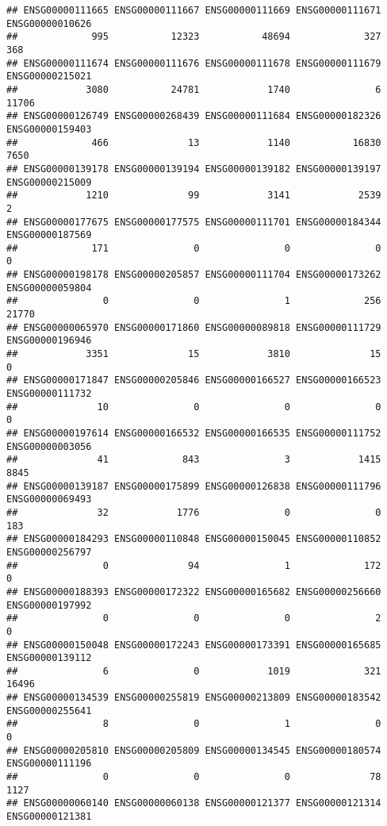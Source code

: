 \documentclass[
]{article}
\begin{document}
\begin{verbatim}
## ENSG00000111665 ENSG00000111667 ENSG00000111669 ENSG00000111671 ENSG00000010626 
##             995           12323           48694             327             368 
## ENSG00000111674 ENSG00000111676 ENSG00000111678 ENSG00000111679 ENSG00000215021 
##            3080           24781            1740               6           11706 
## ENSG00000126749 ENSG00000268439 ENSG00000111684 ENSG00000182326 ENSG00000159403 
##             466              13            1140           16830            7650 
## ENSG00000139178 ENSG00000139194 ENSG00000139182 ENSG00000139197 ENSG00000215009 
##            1210              99            3141            2539               2 
## ENSG00000177675 ENSG00000177575 ENSG00000111701 ENSG00000184344 ENSG00000187569 
##             171               0               0               0               0 
## ENSG00000198178 ENSG00000205857 ENSG00000111704 ENSG00000173262 ENSG00000059804 
##               0               0               1             256           21770 
## ENSG00000065970 ENSG00000171860 ENSG00000089818 ENSG00000111729 ENSG00000196946 
##            3351              15            3810              15               0 
## ENSG00000171847 ENSG00000205846 ENSG00000166527 ENSG00000166523 ENSG00000111732 
##              10               0               0               0               0 
## ENSG00000197614 ENSG00000166532 ENSG00000166535 ENSG00000111752 ENSG00000003056 
##              41             843               3            1415            8845 
## ENSG00000139187 ENSG00000175899 ENSG00000126838 ENSG00000111796 ENSG00000069493 
##              32            1776               0               0             183 
## ENSG00000184293 ENSG00000110848 ENSG00000150045 ENSG00000110852 ENSG00000256797 
##               0              94               1             172               0 
## ENSG00000188393 ENSG00000172322 ENSG00000165682 ENSG00000256660 ENSG00000197992 
##               0               0               0               2               0 
## ENSG00000150048 ENSG00000172243 ENSG00000173391 ENSG00000165685 ENSG00000139112 
##               6               0            1019             321           16496 
## ENSG00000134539 ENSG00000255819 ENSG00000213809 ENSG00000183542 ENSG00000255641 
##               8               0               1               0               0 
## ENSG00000205810 ENSG00000205809 ENSG00000134545 ENSG00000180574 ENSG00000111196 
##               0               0               0              78            1127 
## ENSG00000060140 ENSG00000060138 ENSG00000121377 ENSG00000121314 ENSG00000121381 

\end{verbatim}
\end{document}
